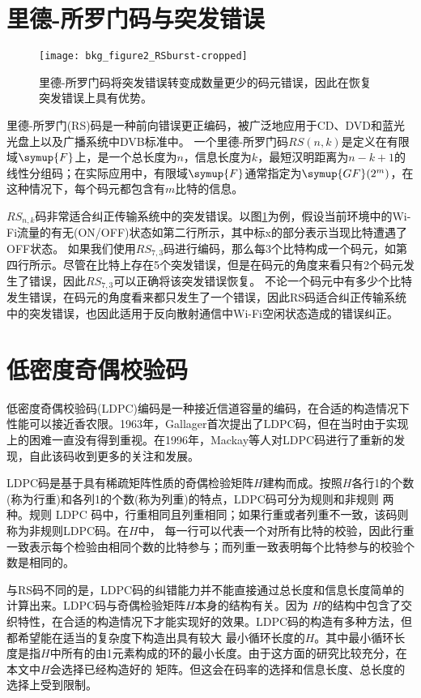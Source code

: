 \section{里德-所罗门码与突发错误}
\begin{figure}
	\centering
	\texttt{[image: bkg\_figure2\_RSburst-cropped]}
	\caption{里德-所罗门码将突发错误转变成数量更少的码元错误，因此在恢复突发错误上具有优势。}
	\label{fig:rscode}
\end{figure}
里德-所罗门(RS)码是一种前向错误更正编码，被广泛地应用于CD、DVD和蓝光光盘上以及广播系统中DVB标准中。 
一个里德-所罗门码$RS(n,k)$是定义在有限域$\symup{F}$上，是一个总长度为$n$，信息长度为$k$，最短汉明距离为$n-k+1$的线性分组码；在实际应用中，有限域$\symup{F}$通常指定为$\symup{GF}(2^m)$，在这种情况下，每个码元都包含有$m$比特的信息。

$RS_{n,k}$码非常适合纠正传输系统中的突发错误。以图\ref{fig:rscode}为例，假设当前环境中的Wi-Fi流量的有无(ON/OFF)状态如第二行所示，其中标x的部分表示当现比特遭遇了OFF状态。
如果我们使用$RS_{7,3}$码进行编码，那么每3个比特构成一个码元，如第四行所示。尽管在比特上存在5个突发错误，但是在码元的角度来看只有2个码元发生了错误，因此$RS_{7,3}$可以正确将该突发错误恢复。
不论一个码元中有多少个比特发生错误，在码元的角度看来都只发生了一个错误，因此RS码适合纠正传输系统中的突发错误，也因此适用于反向散射通信中Wi-Fi空闲状态造成的错误纠正。
\section{低密度奇偶校验码}

低密度奇偶校验码(LDPC)编码是一种接近信道容量的编码，在合适的构造情况下性能可以接近香农限。1963年，Gallager首次提出了LDPC码，但在当时由于实现上的困难一直没有得到重视。在1996年，Mackay等人对LDPC码进行了重新的发现，自此该码收到更多的关注和发展。

LDPC码是基于具有稀疏矩阵性质的奇偶检验矩阵$H$建构而成。按照$H$各行1的个数(称为行重)和各列1的个数(称为列重)的特点，LDPC码可分为规则和非规则
两种。规则 LDPC 码中，行重相同且列重相同；如果行重或者列重不一致，该码则称为非规则LDPC码。在$H$中，
每一行可以代表一个对所有比特的校验，因此行重一致表示每个检验由相同个数的比特参与；而列重一致表明每个比特参与的校验个数是相同的。

与RS码不同的是，LDPC码的纠错能力并不能直接通过总长度和信息长度简单的计算出来。LDPC码与奇偶检验矩阵$H$本身的结构有关。因为
$H$的结构中包含了交织特性，在合适的构造情况下才能实现好的效果。LDPC码的构造有多种方法，但都希望能在适当的复杂度下构造出具有较大
最小循环长度的$H$。其中最小循环长度是指$H$中所有的由1元素构成的环的最小长度。由于这方面的研究比较充分，在本文中$H$会选择已经构造好的
矩阵。但这会在码率的选择和信息长度、总长度的选择上受到限制。